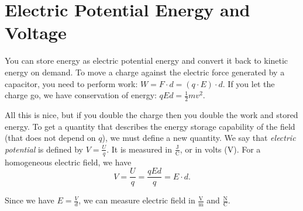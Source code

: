 \documentclass[class=article, crop=false]{standalone}
\begin{document}
  \section{Electric Potential Energy and Voltage}
  You can store energy as electric potential energy and convert it back to kinetic energy on demand. To move a charge against the electric force generated by a capacitor, you need to perform work: $W = F\cdot d = (q\cdot E)\cdot d$. If you let the charge go, we have conservation of energy: $qEd = \frac{1}{2}mv^2$. \par
  All this is nice, but if you double the charge then you double the work and stored energy. To get a quantity that describes the energy storage capability of the field (that does not depend on $q$), we must define a new quantity. We say that \emph{electric potential} is defined by $V = \frac{U}{q}$. It is measured in $\frac{\mathrm{J}}{\mathrm{C}}$, or in volts ($\mathrm{V}$). For a homogeneous electric field, we have
  \[
    V = \frac{U}{q} = \frac{qEd}{q} = E\cdot d.
  \]
  \begin{note}{}
    Since we have $E = \frac{V}{d}$, we can measure electric field in $\frac{\mathrm{V}}{\mathrm{m}}$ and $\frac{\mathrm{N}}{\mathrm{C}}$.
  \end{note}
\end{document}
